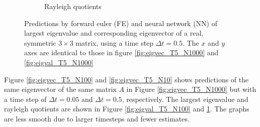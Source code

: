 \documentclass[12pt]{extarticle}
\begin{document}
\begin{figure}[h]
\begin{subfigure}{0.49\textwidth}
		\caption{Rayleigh quotients}
		\label{fig:eigval_T5_N10}
	\end{subfigure}
	\caption{Predictions by forward euler (FE) and neural network (NN) of largest eigenvalue and corresponding eigenvector of a real, symmetric $3\times 3$ matrix, using a time step $\Delta t = 0.5$. The $x$ and $y$ axes are identical to those in figure \ref{fig:eigvec_T5_N1000} and \ref{fig:eigval_T5_N1000}}
	\label{fig:eig_T5_N10}
\end{figure}


Figure \ref{fig:eigvec_T5_N100} and \ref{fig:eigvec_T5_N10} shows predictions of the same eigenvector of the same matrix $A$ in Figure \ref{fig:eigvec_T5_N1000} but with a time step of $\Delta t = 0.05$ and $\Delta t = 0.5$, respectively. The largest eigenvalue and rayleigh quotients are shown in Figure \ref{fig:eigval_T5_N100} and \ref{fig:eigval_T5_N10}.
The graphs are less smooth due to larger timesteps and fewer estimates. 
\end{document}
